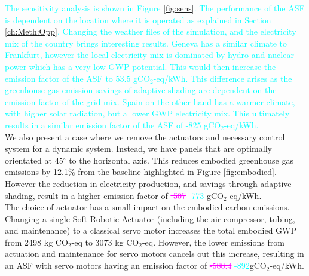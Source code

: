 \textcolor{cyan}{The sensitivity analysis is shown in Figure \ref{fig:sens}. The performance of the ASF is dependent on the location where it is operated as explained in Section \ref{ch:Meth:Opp}. Changing the weather files of the simulation, and the electricity mix of the country brings interesting results. Geneva has a similar climate to Frankfurt, however the local electricity mix is dominated by hydro and nuclear power which has a very low GWP potential\cite{itten2012life}. This would then increase the emission factor of the ASF to 53.5 gCO$_{2}$-eq/kWh. This difference arises as the greenhouse gas emission savings of adaptive shading are dependent on the emission factor of the grid mix.
Spain on the other hand has a warmer climate, with higher solar radiation, but a lower GWP electricity mix. This ultimately results in a similar emission factor of the ASF of -825 gCO$_{2}$-eq/kWh.}\\


We also present a case where we remove the actuators and necessary control system for a dynamic system. Instead, we have panels that are optimally orientated at 45$^{\circ}$ to the horizontal axis. This reduces embodied greenhouse gas emissions by 12.1\% from the baseline highlighted in Figure \ref{fig:embodied}. However the reduction in electricity production, and savings through adaptive shading, result in a higher emission factor of \textcolor{magenta}{\sout{-507}} \textcolor{cyan}{-773} gCO$_{2}$-eq/kWh.\\

The choice of actuator has a small impact on the embodied carbon emissions. Changing a single Soft Robotic Actuator (including the air compressor, tubing, and maintenance) to a classical servo motor increases the total embodied GWP from 2498 kg CO$_{2}$-eq to 3073 kg CO$_{2}$-eq. However, the lower emissions from actuation and maintenance for servo motors cancels out this increase, resulting in an ASF with servo motors having an emission factor of \textcolor{magenta}{\sout{-588.4}} \textcolor{cyan}{-892}gCO$_{2}$-eq/kWh.\\

